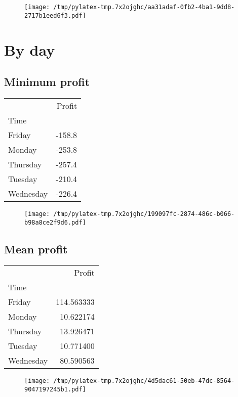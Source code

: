 \documentclass{article}%
\begin{document}
\begin{figure}[htbp]%
\centering%
\texttt{[image: /tmp/pylatex-tmp.7x2ojghc/aa31adaf-0fb2-4ba1-9dd8-2717b1eed6f3.pdf]}%
\end{figure}

%
\newpage %
\section{By day}%
\label{sec:Byday}%
\subsection{Minimum profit }%
\label{subsec:Minimumprofit}%
\begin{tabular}{lr}
\toprule
{} &  Profit \\
Time      &         \\
\midrule
Friday    &  -158.8 \\
Monday    &  -253.8 \\
Thursday  &  -257.4 \\
Tuesday   &  -210.4 \\
Wednesday &  -226.4 \\
\bottomrule
\end{tabular}
%


\begin{figure}[htbp]%
\centering%
\texttt{[image: /tmp/pylatex-tmp.7x2ojghc/199097fc-2874-486c-b066-b98a8ce2f9d6.pdf]}%
\end{figure}

%
\newpage %
\subsection{Mean profit }%
\label{subsec:Meanprofit}%
\begin{tabular}{lr}
\toprule
{} &      Profit \\
Time      &             \\
\midrule
Friday    &  114.563333 \\
Monday    &   10.622174 \\
Thursday  &   13.926471 \\
Tuesday   &   10.771400 \\
Wednesday &   80.590563 \\
\bottomrule
\end{tabular}
%


\begin{figure}[htbp]%
\centering%
\texttt{[image: /tmp/pylatex-tmp.7x2ojghc/4d5dac61-50eb-47dc-8564-9047197245b1.pdf]}%
\end{figure}
\end{document}
